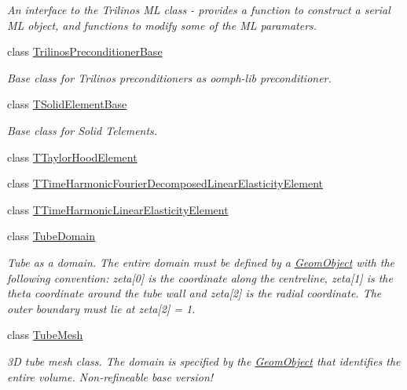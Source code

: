 \begin{DoxyCompactItemize}
\begin{DoxyCompactList}\small\item\em An interface to the Trilinos ML class -\/ provides a function to construct a serial ML object, and functions to modify some of the ML paramaters. \end{DoxyCompactList}\item 
class \hyperlink{classoomph_1_1TrilinosPreconditionerBase}{Trilinos\+Preconditioner\+Base}
\begin{DoxyCompactList}\small\item\em Base class for Trilinos preconditioners as oomph-\/lib preconditioner. \end{DoxyCompactList}\item 
class \hyperlink{classoomph_1_1TSolidElementBase}{T\+Solid\+Element\+Base}
\begin{DoxyCompactList}\small\item\em Base class for Solid Telements. \end{DoxyCompactList}\item 
class \hyperlink{classoomph_1_1TTaylorHoodElement}{T\+Taylor\+Hood\+Element}
\item 
class \hyperlink{classoomph_1_1TTimeHarmonicFourierDecomposedLinearElasticityElement}{T\+Time\+Harmonic\+Fourier\+Decomposed\+Linear\+Elasticity\+Element}
\item 
class \hyperlink{classoomph_1_1TTimeHarmonicLinearElasticityElement}{T\+Time\+Harmonic\+Linear\+Elasticity\+Element}
\item 
class \hyperlink{classoomph_1_1TubeDomain}{Tube\+Domain}
\begin{DoxyCompactList}\small\item\em Tube as a domain. The entire domain must be defined by a \hyperlink{classoomph_1_1GeomObject}{Geom\+Object} with the following convention\+: zeta\mbox{[}0\mbox{]} is the coordinate along the centreline, zeta\mbox{[}1\mbox{]} is the theta coordinate around the tube wall and zeta\mbox{[}2\mbox{]} is the radial coordinate. The outer boundary must lie at zeta\mbox{[}2\mbox{]} = 1. \end{DoxyCompactList}\item 
class \hyperlink{classoomph_1_1TubeMesh}{Tube\+Mesh}
\begin{DoxyCompactList}\small\item\em 3D tube mesh class. The domain is specified by the \hyperlink{classoomph_1_1GeomObject}{Geom\+Object} that identifies the entire volume. Non-\/refineable base version! \end{DoxyCompactList}\item 

\end{DoxyCompactItemize}
